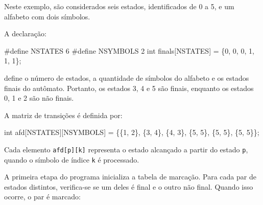 \documentclass[
  brazilian,
  letterpaper,
]{book}
\newenvironment{Shaded}{\begin{snugshade}}{\end{snugshade}}
\newcommand{\DataTypeTok}[1]{\textcolor[rgb]{0.68,0.00,0.00}{#1}}
\newcommand{\DecValTok}[1]{\textcolor[rgb]{0.68,0.00,0.00}{#1}}
\newcommand{\NormalTok}[1]{\textcolor[rgb]{0.00,0.23,0.31}{#1}}
\newcommand{\OperatorTok}[1]{\textcolor[rgb]{0.37,0.37,0.37}{#1}}
\newcommand{\PreprocessorTok}[1]{\textcolor[rgb]{0.68,0.00,0.00}{#1}}
\theoremstyle{plain}
\theoremstyle{definition}
\theoremstyle{remark}
\begin{document}
Neste exemplo, são considerados seis estados, identificados de 0 a 5, e
um alfabeto com dois símbolos.

A declaração:

\begin{Shaded}
\begin{Highlighting}[]
\PreprocessorTok{\#define NSTATES }\DecValTok{6}
\PreprocessorTok{\#define NSYMBOLS }\DecValTok{2}
\DataTypeTok{int}\NormalTok{ finals}\OperatorTok{[}\NormalTok{NSTATES}\OperatorTok{]} \OperatorTok{=} \OperatorTok{\{}\DecValTok{0}\OperatorTok{,} \DecValTok{0}\OperatorTok{,} \DecValTok{0}\OperatorTok{,} \DecValTok{1}\OperatorTok{,} \DecValTok{1}\OperatorTok{,} \DecValTok{1}\OperatorTok{\};}
\end{Highlighting}
\end{Shaded}

define o número de estados, a quantidade de símbolos do alfabeto e os
estados finais do autômato. Portanto, os estados 3, 4 e 5 são finais,
enquanto os estados 0, 1 e 2 são não finais.

A matriz de transições é definida por:

\begin{Shaded}
\begin{Highlighting}[]
\DataTypeTok{int}\NormalTok{ afd}\OperatorTok{[}\NormalTok{NSTATES}\OperatorTok{][}\NormalTok{NSYMBOLS}\OperatorTok{]} \OperatorTok{=}
   \OperatorTok{\{\{}\DecValTok{1}\OperatorTok{,} \DecValTok{2}\OperatorTok{\},}
    \OperatorTok{\{}\DecValTok{3}\OperatorTok{,} \DecValTok{4}\OperatorTok{\},}
    \OperatorTok{\{}\DecValTok{4}\OperatorTok{,} \DecValTok{3}\OperatorTok{\},}
    \OperatorTok{\{}\DecValTok{5}\OperatorTok{,} \DecValTok{5}\OperatorTok{\},}
    \OperatorTok{\{}\DecValTok{5}\OperatorTok{,} \DecValTok{5}\OperatorTok{\},}
    \OperatorTok{\{}\DecValTok{5}\OperatorTok{,} \DecValTok{5}\OperatorTok{\}\};}
\end{Highlighting}
\end{Shaded}

Cada elemento \texttt{afd{[}p{]}{[}k{]}} representa o estado alcançado a
partir do estado \texttt{p}, quando o símbolo de índice \texttt{k} é
processado.

A primeira etapa do programa inicializa a tabela de marcação. Para cada
par de estados distintos, verifica-se se um deles é final e o outro não
final. Quando isso ocorre, o par é marcado:
\end{document}
